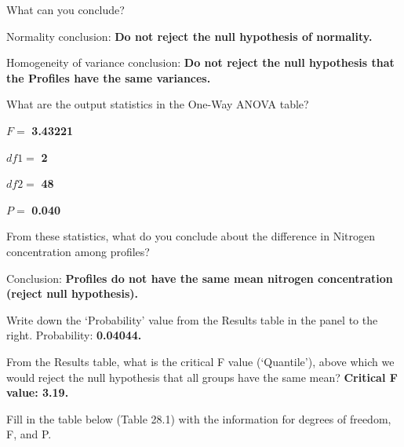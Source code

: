 \documentclass[
  openany]{krantz}
\begin{document}
What can you conclude?

Normality conclusion: \textbf{Do not reject the null hypothesis of normality.}

Homogeneity of variance conclusion: \textbf{Do not reject the null hypothesis that the Profiles have the same variances.}

What are the output statistics in the One-Way ANOVA table?

\(F =\) \textbf{3.43221}

\(df1 =\) \textbf{2}

\(df2 =\) \textbf{48}

\(P =\) \textbf{0.040}

From these statistics, what do you conclude about the difference in Nitrogen concentration among profiles?

Conclusion: \textbf{Profiles do not have the same mean nitrogen concentration (reject null hypothesis).}

Write down the `Probability' value from the Results table in the panel to the right.
Probability: \textbf{0.04044.}

From the Results table, what is the critical F value (`Quantile'), above which we would reject the null hypothesis that all groups have the same mean? \textbf{Critical F value: 3.19.}

Fill in the table below (Table 28.1) with the information for degrees of freedom, F, and P.
\end{document}
